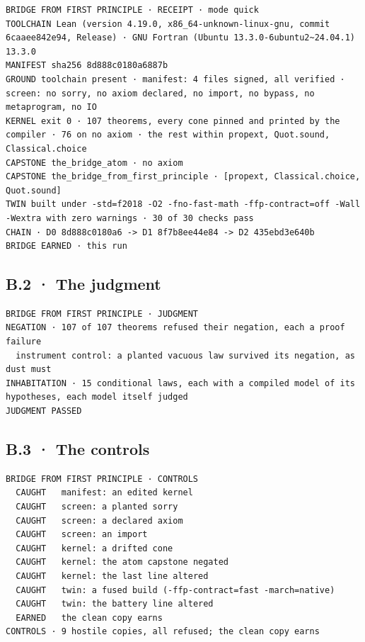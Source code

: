 \documentclass[10pt,twocolumn]{article}
\begin{document}
\begin{Verbatim}
BRIDGE FROM FIRST PRINCIPLE · RECEIPT · mode quick
TOOLCHAIN Lean (version 4.19.0, x86_64-unknown-linux-gnu, commit 6caaee842e94, Release) · GNU Fortran (Ubuntu 13.3.0-6ubuntu2~24.04.1) 13.3.0
MANIFEST sha256 8d888c0180a6887b
GROUND toolchain present · manifest: 4 files signed, all verified · screen: no sorry, no axiom declared, no import, no bypass, no metaprogram, no IO
KERNEL exit 0 · 107 theorems, every cone pinned and printed by the compiler · 76 on no axiom · the rest within propext, Quot.sound, Classical.choice
CAPSTONE the_bridge_atom · no axiom
CAPSTONE the_bridge_from_first_principle · [propext, Classical.choice, Quot.sound]
TWIN built under -std=f2018 -O2 -fno-fast-math -ffp-contract=off -Wall -Wextra with zero warnings · 30 of 30 checks pass
CHAIN · D0 8d888c0180a6 -> D1 8f7b8ee44e84 -> D2 435ebd3e640b
BRIDGE EARNED · this run
\end{Verbatim}

\hypertarget{b.2-the-judgment}{%
\subsection{B.2 · The judgment}\label{b.2-the-judgment}}

\begin{Verbatim}
BRIDGE FROM FIRST PRINCIPLE · JUDGMENT
NEGATION · 107 of 107 theorems refused their negation, each a proof failure
  instrument control: a planted vacuous law survived its negation, as dust must
INHABITATION · 15 conditional laws, each with a compiled model of its hypotheses, each model itself judged
JUDGMENT PASSED
\end{Verbatim}

\hypertarget{b.3-the-controls}{%
\subsection{B.3 · The controls}\label{b.3-the-controls}}

\begin{Verbatim}
BRIDGE FROM FIRST PRINCIPLE · CONTROLS
  CAUGHT   manifest: an edited kernel
  CAUGHT   screen: a planted sorry
  CAUGHT   screen: a declared axiom
  CAUGHT   screen: an import
  CAUGHT   kernel: a drifted cone
  CAUGHT   kernel: the atom capstone negated
  CAUGHT   kernel: the last line altered
  CAUGHT   twin: a fused build (-ffp-contract=fast -march=native)
  CAUGHT   twin: the battery line altered
  EARNED   the clean copy earns
CONTROLS · 9 hostile copies, all refused; the clean copy earns
\end{Verbatim}
\end{document}
